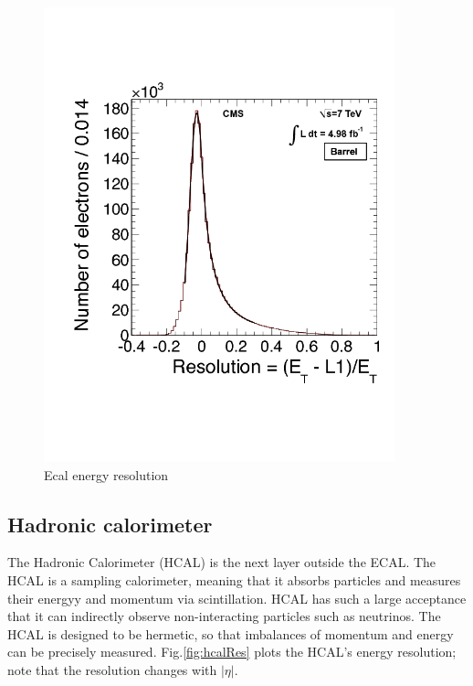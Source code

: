 \begin{figure}[h!]
\begin{centering}
\includegraphics[width=4in]{Chapter3/importfigs/figures_L1EGresolutionEB_cmsTriggerSys.png}
\par\end{centering}
\caption{Ecal energy resolution \label{fig:ecalResL1}}
\end{figure}
 
 
\subsection{Hadronic calorimeter}


The Hadronic Calorimeter (HCAL) is the next layer outside the ECAL. The HCAL is a sampling calorimeter, meaning that it absorbs particles and measures their energyy and momentum via scintillation. HCAL has such a large acceptance that it can indirectly observe non-interacting particles such as neutrinos. The HCAL is designed to be hermetic, so that imbalances of momentum and energy can be precisely measured. Fig.\ref{fig:hcalRes} plots the HCAL's energy resolution; note that the resolution changes with $|\eta|$.

